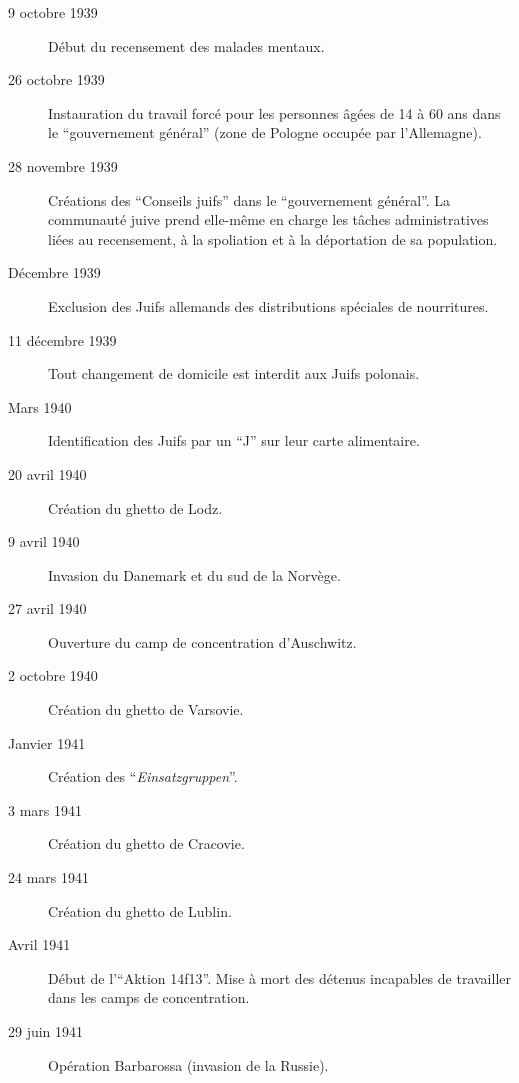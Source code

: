 \begin{description}
    \item[9 octobre 1939] Début du recensement des malades mentaux.
    
    \item[26 octobre 1939] Instauration du travail forcé pour les personnes âgées de 14 à 60 ans dans le \enquote{gouvernement général} (zone de Pologne occupée par l'Allemagne).

    \item[28 novembre 1939] Créations des \enquote{Conseils juifs} dans le \enquote{gouvernement général}. La communauté juive prend elle-même en charge les tâches administratives liées au recensement, à la spoliation et à la déportation de sa population.
    
    \item[Décembre 1939] Exclusion des Juifs allemands des distributions spéciales de nourritures.

    \item[11 décembre 1939] Tout changement de domicile est interdit aux Juifs polonais.

    \item[Mars 1940] Identification des Juifs par un \enquote{J} sur leur carte alimentaire.

    \item[20 avril 1940] Création du ghetto de Lodz.
    
    \item[9 avril 1940] Invasion du Danemark et du sud de la Norvège.

    \item[27 avril 1940] Ouverture du camp de concentration d'Auschwitz.

    \item[2 octobre 1940] Création du ghetto de Varsovie.

    \item[Janvier 1941] Création des \enquote{\textit{Einsatzgruppen}}.
    
    \item[3 mars 1941] Création du ghetto de Cracovie.

    \item[24 mars 1941] Création du ghetto de Lublin.
    
    \item[Avril 1941] Début de l'\enquote{Aktion 14f13}. Mise à mort des détenus incapables de travailler dans les camps de concentration.

    \item[29 juin 1941] Opération Barbarossa (invasion de la Russie).


\end{description}
